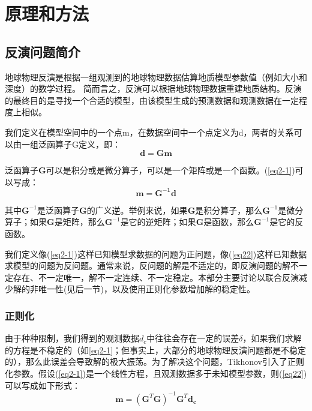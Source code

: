 \cleardoublepage

\section{原理和方法}

\subsection{反演问题简介}

地球物理反演是根据一组观测到的地球物理数据估算地质模型参数值（例如大小和深度）的数学过程。 简而言之，反演可以根据地球物理数据重建地质结构。反演的最终目的是寻找一个合适的模型，由该模型生成的预测数据和观测数据在一定程度上相似。

我们定义在模型空间中的一个点m，在数据空间中一个点定义为d，两者的关系可以由一组泛函算子G定义，即：
\begin{equation}
    \mathbf{d}=\mathbf{Gm}
    \label{eq2-1}
\end{equation}

泛函算子$\mathbf{G}$可以是积分或是微分算子，可以是一个矩阵或是一个函数。(\ref{eq2-1})可以写成：
\begin{equation}
    \mathbf{m}=\mathbf{G^{-1}d}
    \label{eq22}
\end{equation}

其中$\mathbf{G}^{-1}$是泛函算子$\mathbf{G}$的广义逆。举例来说，如果$\mathbf{G}$是积分算子，那么$\mathbf{G}^{-1}$是微分算子；如果$\mathbf{G}$是矩阵，那么$\mathbf{G}^{-1}$是它的逆矩阵；如果$\mathbf{G}$是函数，那么$\mathbf{G}^{-1}$是它的反函数。

我们定义像(\ref{eq2-1})这样已知模型求数据的问题为正问题，像(\ref{eq22})这样已知数据求模型的问题为反问题。通常来说，反问题的解是不适定的，即反演问题的解不一定存在、不一定唯一，解不一定连续、不一定稳定。本部分主要讨论以联合反演减少解的非唯一性(见后一节)，以及使用正则化参数增加解的稳定性。

\subsubsection{正则化}

由于种种限制，我们得到的观测数据$d_c$中往往会存在一定的误差$\delta$，如果我们求解的方程是不稳定的（如\ref{eq2-1}；但事实上，大部分的地球物理反演问题都是不稳定的），那么此误差会导致解的极大振荡。为了解决这个问题，Tikhonov引入了正则化参数。假设(\ref{eq2-1})是一个线性方程，且观测数据多于未知模型参数，则(\ref{eq22})可以写成如下形式：
\begin{equation}
    \mathbf{m}=(\mathbf{G}^T\mathbf{G})^{-1}\mathbf{G}^T\mathbf{d_c}
    \label{regsol1}
\end{equation}

